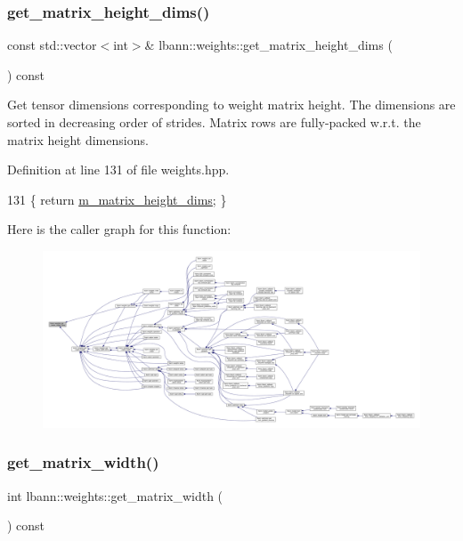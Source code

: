 \subsubsection{\texorpdfstring{get\+\_\+matrix\+\_\+height\+\_\+dims()}{get\_matrix\_height\_dims()}}
{\footnotesize\ttfamily const std\+::vector$<$int$>$\& lbann\+::weights\+::get\+\_\+matrix\+\_\+height\+\_\+dims (\begin{DoxyParamCaption}{ }\end{DoxyParamCaption}) const\hspace{0.3cm}{\ttfamily [inline]}}

Get tensor dimensions corresponding to weight matrix height. The dimensions are sorted in decreasing order of strides. Matrix rows are fully-\/packed w.\+r.\+t. the matrix height dimensions. 

Definition at line 131 of file weights.\+hpp.


\begin{DoxyCode}
131 \{ \textcolor{keywordflow}{return} \hyperlink{classlbann_1_1weights_a9287dfbd8a7e4a9f5e0d6371d43ee92f}{m\_matrix\_height\_dims}; \}
\end{DoxyCode}
Here is the caller graph for this function\+:\nopagebreak
\begin{figure}[H]
\begin{center}
\leavevmode
\includegraphics[width=350pt]{classlbann_1_1weights_a2971f04c57d90fbb09631b1de3dad336_icgraph}
\end{center}
\end{figure}
\mbox{\label{classlbann_1_1weights_abc3cf3a5b992302b1eaaea1fdf3b377d}} 
\subsubsection{\texorpdfstring{get\+\_\+matrix\+\_\+width()}{get\_matrix\_width()}}
{\footnotesize\ttfamily int lbann\+::weights\+::get\+\_\+matrix\+\_\+width (\begin{DoxyParamCaption}{ }\end{DoxyParamCaption}) const}

